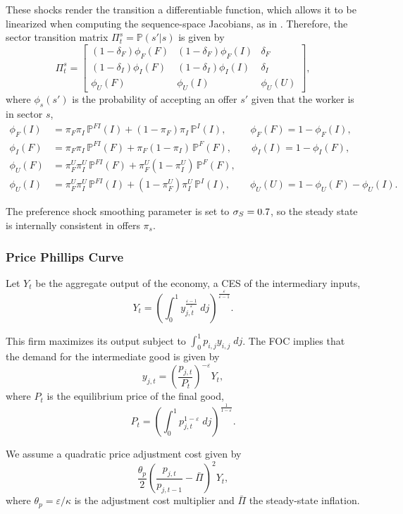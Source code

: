 \documentclass[12pt]{article}
\renewcommand{\P}{\mathbb{P}}
\begin{document}
These shocks render the transition a differentiable function, which allows it to be
linearized when computing the sequence-space Jacobians, as in
\textcite{iskhakov2017endogenous}. Therefore, the sector transition matrix
$\Pi_t^s = \P(s'|s)$ is given by
\[
\Pi_t^s = \begin{bmatrix}
    (1-\delta_F) \phi_F(F) & (1-\delta_F) \phi_F(I) & \delta_F \\
    (1-\delta_I) \phi_I(F) & (1-\delta_I) \phi_I(I) & \delta_I \\
    \phi_U(F) & \phi_U(I) & \phi_U(U)
\end{bmatrix},
\]
where $\phi_s(s')$ is the probability of accepting an offer $s'$ given that the worker
is in sector $s$,
\begin{align*}
\phi_F(I) &= \pi_F \pi_I \, \P^{FI}(I) + (1 - \pi_F) \pi_I \, \P^{I}(I),
\qquad \, \; \phi_F(F) = 1 - \phi_F(I), \\
\phi_I(F) &= \pi_F \pi_I \, \P^{FI}(F) + \pi_F (1 - \pi_I) \, \P^{F}(F),
\qquad \phi_I(I) = 1 - \phi_I(F), \\
\phi_U(F) &= \pi_F^U \pi_I^U \, \P^{FI}(F) + \pi_F^U (1 - \pi_I^U) \,\P^{F}(F), \\
\phi_U(I) &= \pi_F^U \pi_I^U \, \P^{FI}(I) + (1-\pi_F^U) \pi_I^U \, \P^{I}(I),
\qquad \phi_U(U) = 1 - \phi_U(F) - \phi_U(I).
\end{align*}

The preference shock smoothing parameter is set to $\sigma_S = 0.7$, so the steady
state is internally consistent in offers $\pi_s$.


\subsubsection*{Price Phillips Curve}

Let $Y_t$ be the aggregate output of the economy, a CES of the intermediary inputs,
\[
Y_t = \left(
    \int_0^1 y_{j,t}^\frac{\varepsilon-1}{\varepsilon} \: dj 
\right)^\frac{\varepsilon}{\varepsilon-1}.
\]

This firm maximizes its output subject to $\int_0^1 p_{i,j} y_{i,j} \; dj$. The FOC
implies that the demand for the intermediate good is given by
\[
y_{j,t} = \left( \frac{p_{j,t}}{P_t} \right)^{-\varepsilon} Y_t,
\]
where $P_t$ is the equilibrium price of the final good,
\[
P_t = \left( \int_0^1 p_{j,t}^{1-\varepsilon} \; dj \right)^{\frac{1}{1-\varepsilon}}.
\]

We assume a \textcite{rotemberg1982monopolistic} quadratic price adjustment cost given
by
\[
\frac{\theta_p}{2} \left( \frac{p_{j,t}}{p_{j,t-1}} - \bar \Pi \right)^2 Y_t,
\]
where $\theta_p = \varepsilon / \kappa$ is the adjustment cost multiplier and
$\bar \Pi$ the steady-state inflation.
\end{document}
